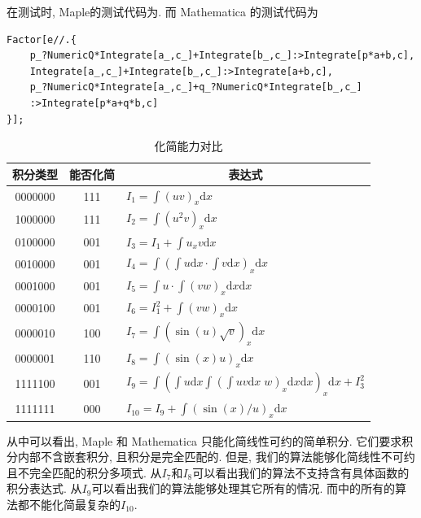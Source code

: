 在测试时, Maple的测试代码为. 而 Mathematica 的测试代码为
\begin{verbatim}
Factor[e//.{
    p_?NumericQ*Integrate[a_,c_]+Integrate[b_,c_]:>Integrate[p*a+b,c],
    Integrate[a_,c_]+Integrate[b_,c_]:>Integrate[a+b,c],
    p_?NumericQ*Integrate[a_,c_]+q_?NumericQ*Integrate[b_,c_]
    :>Integrate[p*a+q*b,c]
}];
\end{verbatim}

\begin{table}[htbp]
\renewcommand{\arraystretch}{1.25}
\centering
\caption{化简能力对比} \label{tb1}
\renewcommand{\dd}[1]{\mathrm{d}#1}
\renewcommand{\ii}[1]{\int\!{#1\dd x}}
\begin{tabular}{ccl}
\hline
积分类型 & 能否化简 & \multicolumn{1}{c}{表达式} \\
\hline
0000000 & 111 & $I_1=\int\!{(uv)_x\dd x}$\\ 
1000000 & 111 & $I_2=\int\!{(u^2v)_x\dd x}$\\ 
0100000 & 001 & $I_3=I_1+\int\!{u_xv\dd x}$\\ 
0010000 & 001 & $I_4=\int\!{(\int\!{u\dd x}\cdot \int\!{v\dd x})_x\dd x}$\\
0001000 & 001 & $I_5=\int\!{u\cdot \int\!{(vw)_x\dd x}\dd x}$\\
0000100 & 001 & $I_6=I_1^2+\int\!{(vw)_x\dd x}$\\
0000010 & 100 & $I_7=\int\!{(\sin(u)\sqrt{v})_x\dd x}$\\
0000001 & 110 & $I_8=\int\!{(\sin(x)u)_x\dd x}$\\
1111100 & 001 & $I_9=\int\!{(\int\!{u\dd x}\int\!{(\int\!{uv\dd x}\;w)_x\dd x\dd x})_x\dd x}+I_3^2$\\
1111111 & 000 & $I_{10}=I_9+\int\!{(\sin(x)/u)_x\dd x}$\\
\hline
\end{tabular}
\end{table} 

从中可以看出, Maple 和 Mathematica 只能化简线性可约的简单积分. 它们要求积分内部不含嵌套积分, 且积分是完全匹配的. 但是, 我们的算法能够化简线性不可约且不完全匹配的积分多项式. 从$I_7$和$I_8$可以看出我们的算法不支持含有具体函数的积分表达式. 从$I_9$可以看出我们的算法能够处理其它所有的情况. 而中的所有的算法都不能化简最复杂的$I_{10}$. 

